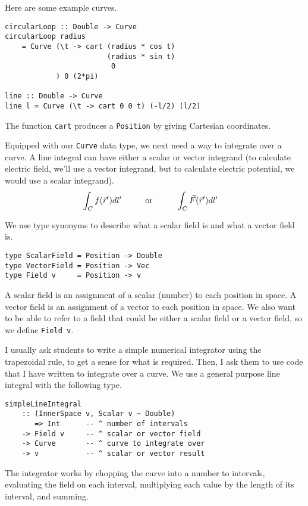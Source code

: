 \documentclass{eptcs}
\begin{document}
Here are some example curves.
\begin{verbatim}
circularLoop :: Double -> Curve
circularLoop radius
    = Curve (\t -> cart (radius * cos t)
                        (radius * sin t)
                         0
            ) 0 (2*pi)

line :: Double -> Curve
line l = Curve (\t -> cart 0 0 t) (-l/2) (l/2)
\end{verbatim}
The function \verb|cart| produces a \verb|Position| by giving Cartesian coordinates.

Equipped with our \verb|Curve| data type, we next need a way to integrate over a curve.
A line integral can have either a scalar or vector integrand
(to calculate electric field, we'll use a vector integrand, but to
calculate electric potential, we would use a scalar integrand).
\begin{align*}
\int_C f(\vec{r}') dl' \hspace{10mm} & \textrm{or} \hspace{10mm} \int_C \vec{F}(\vec{r}') dl'
\end{align*}

We use type synonyms to describe what a scalar field is and
what a vector field is.
\begin{verbatim}
type ScalarField = Position -> Double
type VectorField = Position -> Vec
type Field v     = Position -> v
\end{verbatim}
A scalar field is an assignment of a scalar (number) to each position in space.
A vector field is an assignment of a vector to each position in space.
We also want to be able to refer to a field that could be either
a scalar field or a vector field, so we define \verb|Field v|.

I usually ask students to write a simple numerical integrator
using the trapezoidal rule, to get a sense for what is required.
Then, I ask them to use code that I have written to integrate over a curve.
We use a general purpose line integral with the following type.

\begin{verbatim}
simpleLineIntegral
    :: (InnerSpace v, Scalar v ~ Double)
       => Int      -- ^ number of intervals
    -> Field v     -- ^ scalar or vector field
    -> Curve       -- ^ curve to integrate over
    -> v           -- ^ scalar or vector result
\end{verbatim}
The integrator works by chopping the curve into
a number to intervals, evaluating the field on each interval,
multiplying each value by the length of its interval, and summing.
\end{document}
